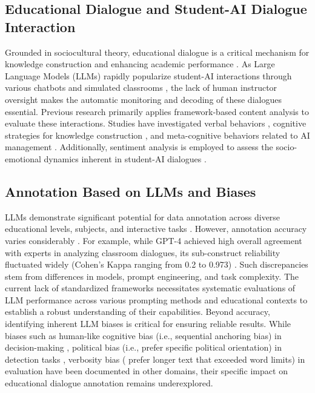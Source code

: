 \documentclass[runningheads]{llncs}
\begin{document}
\subsection{Educational Dialogue and Student-AI Dialogue Interaction}
Grounded in sociocultural theory, educational dialogue is a critical mechanism for knowledge construction and enhancing academic performance \cite{muhonen2017knowledge,howe2019teacher}. As Large Language Models (LLMs) rapidly popularize student-AI interactions through various chatbots and simulated classrooms \cite{nguyen2025reflective,zhang-etal-2025-simulating}, the lack of human instructor oversight makes the automatic monitoring and decoding of these dialogues essential. Previous research primarily applies framework-based content analysis to evaluate these interactions. Studies have investigated verbal behaviors \cite{zhang-etal-2025-simulating}, cognitive strategies for knowledge construction \cite{dang2025human}, and meta-cognitive behaviors related to AI management \cite{edwards2025human}. Additionally, sentiment analysis is employed to assess the socio-emotional dynamics inherent in student-AI dialogues \cite{dang2025human}.

\subsection{Annotation Based on LLMs and Biases}
LLMs demonstrate significant potential for data annotation across diverse educational levels, subjects, and interactive tasks \cite{hao_mapping_2026,jiang2025uncovering,he2025automated}. However, annotation accuracy varies considerably \cite{jiang2025uncovering}. For example, while GPT-4 achieved high overall agreement with experts in analyzing classroom dialogues, its sub-construct reliability fluctuated widely (Cohen’s Kappa ranging from 0.2 to 0.973) \cite{long2024evaluating}. Such discrepancies stem from differences in models, prompt engineering, and task complexity. The current lack of standardized frameworks necessitates systematic evaluations of LLM performance across various prompting methods and educational contexts to establish a robust understanding of their capabilities. Beyond accuracy, identifying inherent LLM biases is critical for ensuring reliable results. While biases such as human-like cognitive bias (i.e.,  sequential anchoring bias) in decision-making \cite{echterhoff-etal-2024-cognitive}, political bias (i.e., prefer specific political orientation) in detection tasks \cite{lin-etal-2025-investigating}, verbosity bias ( prefer longer text that exceeded word limits) in evaluation \cite{zheng2023judging,qian2025towards} have been documented in other domains, their specific impact on educational dialogue annotation remains underexplored. 
\end{document}
